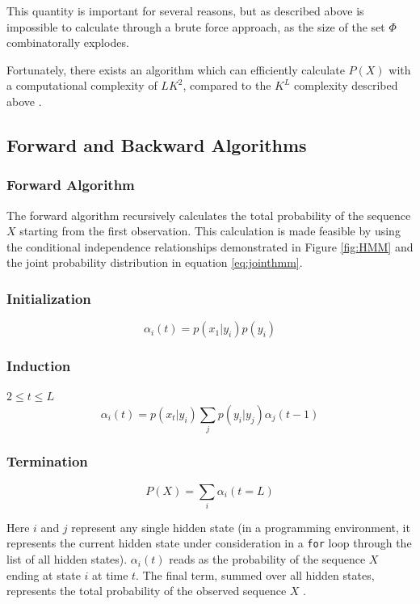 This quantity is important for several reasons, but as described above is impossible to calculate through a brute force approach, as the size of the set $\Phi$ combinatorally explodes.

Fortunately, there exists an algorithm which can efficiently calculate $P(X)$ with a computational complexity of $LK^2$, compared to the $K^L$ complexity described above \cite{Rabiner1989ARecognition}.
\subsection{Forward and Backward Algorithms}
\subsubsection{Forward Algorithm}
The forward algorithm recursively calculates the total probability of the sequence $X$ starting from the first observation. This calculation is made feasible by using the conditional independence relationships demonstrated in Figure \ref{fig:HMM} and the joint probability distribution in equation \ref{eq:jointhmm}.

\subsubsection{Initialization}
\begin{equation}
    \alpha_i(t) = p(x_1|y_i)p(y_i)
\label{eq:fwdinit}
\end{equation}

\subsubsection{Induction}
$2\leq t\leq L$
\begin{equation}
    \alpha_i(t) =p(x_t|y_i)\sum_{j}{p(y_i|y_j)\alpha_j(t-1)}
\label{eq:fwdinduc}
\end{equation}

\subsubsection{Termination}
\begin{equation}
    P(X)= \sum_i{\alpha_i(t=L)}
\label{eq:fwdterm}
\end{equation}

Here $i$ and $j$ represent any single hidden state (in a programming environment, it represents the current hidden state under consideration in a \texttt{for} loop through the list of all hidden states). $\alpha_i(t)$ reads as the probability of the sequence $X$ ending at state $i$ at time $t$. The final term, summed over all hidden states, represents the total probability of the observed sequence $X$ \cite{Rabiner1989ARecognition}.

